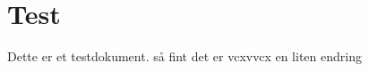 \documentclass{article}
\begin{document}
\section{Test}
Dette er et testdokument. så fint det er vcxvvcx en liten endring

\lipsum[1-2]
\end{document}
